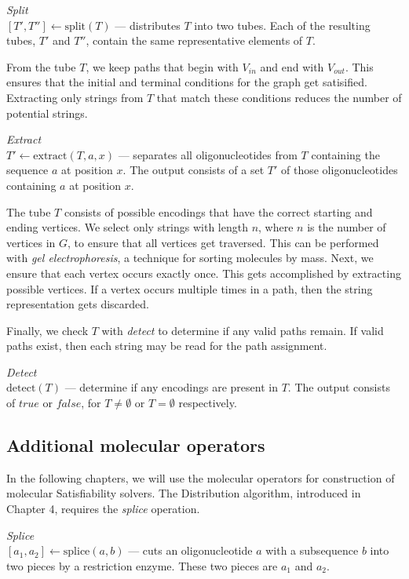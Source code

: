 \begin{definition}
\textit{Split}\\
$[T', T''] \leftarrow \text{split}( T)$ --- distributes $T$ into two tubes.  Each of the resulting tubes, $T'$ and $T''$,  contain the same representative elements of $T$.
\end{definition}

From the tube $T$, we keep paths that begin with $V_{in}$ and end with $V_{out}$.  This ensures that the initial and terminal conditions for the graph get satisified.  Extracting only strings from $T$ that match these conditions reduces the number of potential strings.

\begin{definition}
\textit{Extract}\\
$ T' \leftarrow \text{extract}( T, a, x)$ --- separates all oligonucleotides from $T$ containing the sequence $a$ at position $x$.  The output consists of a set $T'$ of those oligonucleotides containing $a$ at position $x$.
\end{definition}

The tube $T$ consists of possible encodings that have the correct starting and ending vertices. We select only strings with length $n$, where $n$ is the number of vertices in $G$, to ensure that all vertices get traversed.  This can be performed with \textit{gel electrophoresis}, a technique for sorting molecules by mass.
Next, we ensure that each vertex occurs exactly once.  This gets accomplished by extracting possible vertices.  If a vertex occurs multiple times in a path, then the string representation gets discarded.

Finally, we check $T$ with \textit{detect} to determine if any valid paths remain.  If valid paths exist, then each string may be read for the path assignment.

\begin{definition}
\textit{Detect}\\
$ \text{detect}( T)$ --- determine if any encodings are present in $T$.  The output consists of $true$ or $false$, for $T \neq \emptyset$ or $T = \emptyset$ respectively.
\end{definition}

\subsection{Additional molecular operators}

In the following chapters, we will use the molecular operators for construction of molecular {\sc Satisfiability} solvers.  The Distribution algorithm, introduced in Chapter 4, requires the \textit{splice} operation.
\begin{definition}
\textit{Splice}\\
$[a_1, a_2] \leftarrow \text{splice}(a, b)$ --- cuts an oligonucleotide $a$ with a subsequence $b$ into two pieces by a restriction enzyme.  These two pieces are $a_1$ and $a_2$.
\end{definition}

